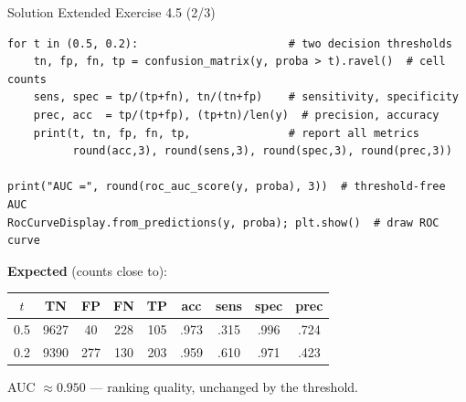 \documentclass[aspectratio=169,11pt]{beamer}
\begin{document}
\begin{frame}[fragile]{Solution \textemdash{} Extended Exercise 4.5 (2/3)}
\begin{solutionbox}
\begin{lstlisting}[basicstyle=\ttfamily\scriptsize\linespread{0.9}\selectfont]
for t in (0.5, 0.2):                       # two decision thresholds
    tn, fp, fn, tp = confusion_matrix(y, proba > t).ravel()  # cell counts
    sens, spec = tp/(tp+fn), tn/(tn+fp)    # sensitivity, specificity
    prec, acc  = tp/(tp+fp), (tp+tn)/len(y)  # precision, accuracy
    print(t, tn, fp, fn, tp,               # report all metrics
          round(acc,3), round(sens,3), round(spec,3), round(prec,3))

print("AUC =", round(roc_auc_score(y, proba), 3))  # threshold-free AUC
RocCurveDisplay.from_predictions(y, proba); plt.show()  # draw ROC curve
\end{lstlisting}
\textbf{Expected} (counts close to):
\begin{center}\scriptsize
\begin{tabular}{ccccccccc}
\toprule
$t$ & TN & FP & FN & TP & acc & sens & spec & prec\\
\midrule
0.5 & 9627 & 40  & 228 & 105 & .973 & .315 & .996 & .724\\
0.2 & 9390 & 277 & 130 & 203 & .959 & .610 & .971 & .423\\
\bottomrule
\end{tabular}
\end{center}
\vspace{-1mm}
AUC $\approx 0.950$ --- ranking quality, unchanged by the threshold.
\end{solutionbox}
\end{frame}
\end{document}
